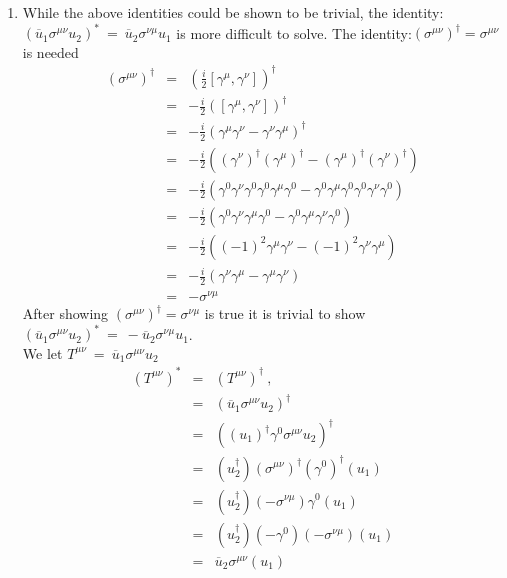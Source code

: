 \documentclass[12pt]{article}
\def \bea{\begin{eqnarray}}
\def \eea{\end{eqnarray}}
\def \ou{\overline{u}}
\def \ga{\gamma}
\def \si{\sigma}
\begin{document}
\begin{enumerate}
\item  While the above identities could be shown to be trivial, the identity: $(\ou_1 \si^{\mu\nu} u_2)^* ~=~\ou_2 \si^{\nu\mu} u_1$ is more difficult to solve. The identity:$(\si^{\mu\nu})^\dag =\si^{\mu\nu}$ is needed
\bea
(\si^{\mu\nu})^\dag &=& (\frac{i}{2}[\ga^\mu,\ga^\nu])^\dag \\
&=& -\frac{i}{2}([\ga^\mu,\ga^\nu])^\dag\\
&=& -\frac{i}{2}(\ga^\mu\ga^\nu-\ga^\nu\ga^\mu)^\dag \\
&=& -\frac{i}{2}((\ga^\nu)^\dag(\ga^\mu)^\dag-(\ga^\mu)^\dag(\ga^\nu)^\dag) \\
&=& -\frac{i}{2}(\ga^0\ga^\nu\ga^0\ga^0\ga^\mu\ga^0-\ga^0\ga^\mu\ga^0\ga^0\ga^\nu\ga^0)\\
&=& -\frac{i}{2}(\ga^0\ga^\nu\ga^\mu\ga^0-\ga^0\ga^\mu \ga^\nu\ga^0)\\
&=& -\frac{i}{2}((-1)^2\ga^\mu\ga^\nu-(-1)^2\ga^\nu \ga^\mu) \\
&=& -\frac{i}{2}(\ga^\nu\ga^\mu-\ga^\mu \ga^\nu)\\
&=& -\si^{\nu\mu}
\eea
After showing $(\si^{\mu\nu})^\dag =\si^{\nu\mu}$ is true it is trivial to show $(\ou_1 \si^{\mu\nu} u_2)^* ~=~ -\ou_2 \si^{\nu\mu} u_1$.\\
We let $T^{\mu\nu} ~=~ \ou_1 \si^{\mu\nu} u_2$
\bea
(T^{\mu\nu})^* &=& (T^{\mu\nu})^\dag ~,~~ \\
&=& (\ou_1 \si^{\mu\nu} u_2)^\dag \\
&=& ((u_1)^\dag \ga^0 \si^{\mu\nu} u_2)^\dag \\
&=& (u_2^\dag)(\si^{\mu\nu})^\dag (\ga^0)^\dag(u_1)\\
&=& (u_2^\dag)(-\si^{\nu\mu})\ga^0(u_1)\\
&=& (u_2^\dag)(-\ga^0)(-\si^{\nu\mu})(u_1)\\
&=& \ou_2 \si^{\mu\nu}(u_1)
\eea


\end{enumerate}
\end{document}
